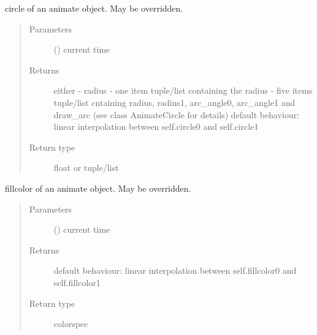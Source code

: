 \documentclass[letterpaper,10pt,english]{sphinxmanual}
\begin{document}
\begin{fulllineitems}
\begin{fulllineitems}
\end{fulllineitems}


\begin{fulllineitems}
\label{\detokenize{Reference:salabim.Animate.circle}}
circle of an animate object. May be overridden.
\begin{quote}\begin{description}
\item[{Parameters}] \leavevmode
{} () \textendash{} current time

\item[{Returns}] \leavevmode
{} \textendash{} either 
- radius 
- one item tuple/list containing the radius 
- five items tuple/list cntaining radius, radius1, arc\_angle0, arc\_angle1 and draw\_arc 
(see class AnimateCircle for details) 
default behaviour: linear interpolation between self.circle0 and self.circle1

\item[{Return type}] \leavevmode
float or tuple/list

\end{description}\end{quote}

\end{fulllineitems}


\begin{fulllineitems}
\label{\detokenize{Reference:salabim.Animate.fillcolor}}
fillcolor of an animate object. May be overridden.
\begin{quote}\begin{description}
\item[{Parameters}] \leavevmode
{} () \textendash{} current time

\item[{Returns}] \leavevmode
{} \textendash{} default behaviour: linear interpolation between self.fillcolor0 and self.fillcolor1

\item[{Return type}] \leavevmode
colorspec

\end{description}\end{quote}


\end{fulllineitems}
\end{fulllineitems}
\end{document}
